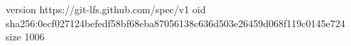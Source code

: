 version https://git-lfs.github.com/spec/v1
oid sha256:0ecf027124befedf58bf68eba87056138c636d503e26459d068f119c0145e724
size 1006
